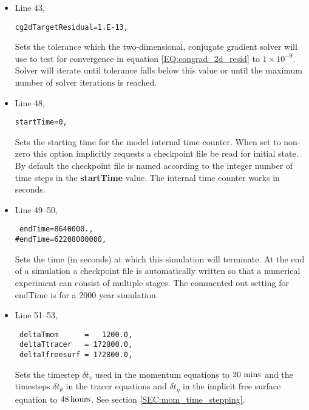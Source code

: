 {\begin{itemize}
\item Line 43,
\begin{verbatim}
cg2dTargetResidual=1.E-13,
\end{verbatim}
  Sets the tolerance which the two-dimensional, conjugate
  gradient solver will use to test for convergence in equation 
  \ref{EQ:congrad_2d_resid} to $1 \times 10^{-9}$.
  Solver will iterate until 
  tolerance falls below this value or until the maximum number of
  solver iterations is reached.\\

\item Line 48,
\begin{verbatim}
startTime=0,
\end{verbatim}
Sets the starting time for the model internal time counter.
When set to non-zero this option implicitly requests a 
checkpoint file be read for initial state.
By default the checkpoint file is named according to
the integer number of time steps in the {\bf startTime} value.
The internal time counter works in seconds.

\item Line 49--50,
\begin{verbatim}
 endTime=8640000.,
#endTime=62208000000,
\end{verbatim}
  Sets the time (in seconds) at which this simulation will terminate.
  At the end of a simulation a checkpoint file is automatically
  written so that a numerical experiment can consist of multiple
  stages.  The commented out setting for endTime is for a 2000 year
  simulation.

\item Line 51--53,
\begin{verbatim}
 deltaTmom      =   1200.0,
 deltaTtracer   = 172800.0,
 deltaTfreesurf = 172800.0,
\end{verbatim}
  Sets the timestep $\delta t_{v}$ used in the momentum equations to
  $20~{\rm mins}$ and the timesteps $\delta t_{\theta}$ in the tracer
  equations and $\delta t_{\eta}$ in the implicit free surface
  equation to $48\mbox{\,hours}$.  See section
  \ref{SEC:mom_time_stepping}.\\


\end{itemize}}
